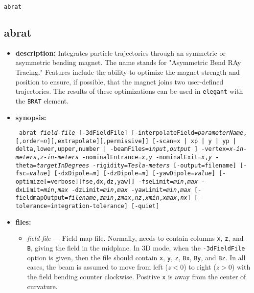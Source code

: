 \documentclass[11pt]{article}
\begin{document}
\newpage
\begin{center}{\Large\verb|abrat|}\end{center}
\subsection{abrat}

\begin{itemize}
\item {\bf description:}  Integrates particle trajectories through an symmetric or asymmetric bending magnet.
The name stands for "Asymmetric Bend RAy Tracing."
Features include the ability to optimize the magnet strength and position to ensure, if possible, that the
magnet joins two user-defined trajectories.
The results of these optimizations can be used in {\tt elegant} with the \verb|BRAT| element.

\item {\bf synopsis:}
\begin{flushleft}{\tt
abrat {\em field-file} [-3dFieldFile] [-interpolateField={\em parameterName},[,order={\em n}][,extrapolate][,permissive]] 
 [{-scan={x | xp | y | yp | delta},lower,upper,number | -beamFiles={\em input},{\em output} }]
 -vertex={\em x-in-meters},{\em z-in-meters} -nominalEntrance={\em x},{\em y} -nominalExit={\em x},{\em y}
 -theta={\em targetInDegrees} -rigidity={\em Tesla-meters}
 [-output=filename] [-fsc={\em value}] [-dxDipole={\em m}] [-dzDipole={\em m}] [-yawDipole={\em value}]
 {[-optimize[=verbose][{fse,dx,dz,yaw}]]
  -fseLimit={\em min},{\em max} -dxLimit={\em min},{\em max} -dzLimit={\em min},{\em max} -yawLimit={\em min},{\em max}}
 [-fieldmapOutput={\em filename},{\em zmin},{\em zmax},{\em nz},{\em xmin},{\em xmax},{\em nx}]
 [-tolerance=integration-tolerance]
 [-quiet]
}\end{flushleft}

\item {\bf files:}
\begin{itemize}
\item {\em field-file} --- Field map file. Normally, needs to contain columns \verb|x|, \verb|z|, and \verb|B|, giving the 
field in the midplane. In 3D mode, when the \verb|-3dFieldFile| option is given, then the file should contain
\verb|x|, \verb|y|, \verb|z|, \verb|Bx|, \verb|By|, and \verb|Bz|. 
In all cases, the beam is assumed to move from left ($z<0$) to right ($z>0$) with the field bending counter clockwise.
Positive \verb|x| is away from the center of curvature.
\end{itemize}


\end{itemize}
\end{document}
